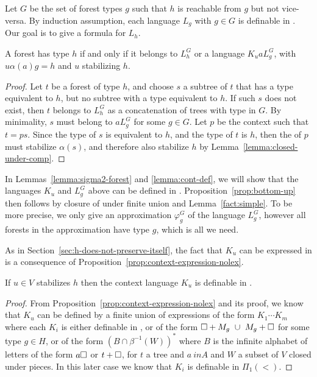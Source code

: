 \documentclass{LMCS}
\begin{document}
{Let $G$ be the set of forest types $g$ such that $h$ is reachable from
$g$ but not vice-versa.  By induction assumption, each language $L_g$
with $g \in G$ is definable in \Stwo. Our goal is to give a
formula for $L_h$.

\begin{lem}\label{lem:decompo-nonminim-nolex}
A forest has type $h$ if and only if it belongs to $L^G_h$ or a
language $K_u a L^G_g$, with $u\alpha(a)g = h$ and $u$ stabilizing $h$.
\end{lem}
\vspace{-.2cm}
\begin{proof}
  Let $t$ be a forest of type $h$, and choose $s$ a subtree of $t$ that has a
  type equivalent to $h$, but no subtree with a type equivalent to $h$. If such
  $s$ does not exist, then $t$ belongs to $L^G_h$ as a concatenation of trees
  with type in $G$.  By minimality, $s$ must belong to $a L^G_g$ for some $g\in
  G$. Let $p$ be the context such that $t=ps$.  Since the type of $s$ is
  equivalent to $h$, and the type of $t$ is $h$, then the of $p$ must
  stabilize $\alpha(s)$,  and therefore also stabilize $h$ by
  Lemma~\ref{lemma:closed-under-comp}.
\end{proof}

In Lemmas~\ref{lemma:sigma2-forest} and \ref{lemma:cont-def}, we will
show that the languages $K_u$ and $L^G_g$ above can be defined in
\Stwo. Proposition~\ref{prop:bottom-up} then follows by closure of \Stwo
under finite union and Lemma~\ref{fact:simple}.
To be more precise, we only give an approximation
$\varphi^G_g$ of the language $L^G_g$, however all forests in the
approximation have type $g$, which is all we need.

As in Section~\ref{sec:h-does-not-preserve-itself}, the fact that $K_u$ can be
expressed in \Stwo is a consequence of
Proposition~\ref{prop:context-expression-nolex}.

\begin{lem}\label{lemma:cont-def}
 If   $u \in V$  stabilizes $h$ then the context language $K_u$ is definable in \Stwo.
\end{lem}
\begin{proof}
  From Proposition~\ref{prop:context-expression-nolex} and its proof,
  we know that $K_u$ can be defined by a finite union of expressions
  of the form $K_{1} \cdots K_{m}$ where each $K_{i}$ is either
  definable in \Stwo, or of the form $\Box + M_g \ \cup\ M_g + \Box $ for some type $g
  \in H$, or of the form $(B \cap \beta^{-1}(W))^*$ where $B$ is the
  infinite alphabet of letters of the form $a \Box$ or $t + \Box$,
  for $t$ a tree and $a\ in A$ and $W$ a subset of $V$ closed under
  pieces. In this later case we know that $K_i$ is definable in
  $\Pi_1(<)$.
 

\end{proof}}
\end{document}
